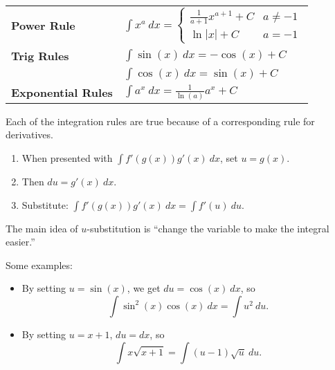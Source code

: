 \begin{center}
\def\arraystretch{1.5}
\begin{tabular}{@{}ll@{}}
\toprule[0.4mm]
\textbf{Power Rule}
 & $\int x^a \ dx = \begin{cases}
\frac{1}{a+1}x^{a+1} + C & a \neq -1\\
\ln|x| + C & a = -1
\end{cases}$ \\
\textbf{Trig Rules}  & $\int \sin(x)\ dx = -\cos(x)+C$\\
                     & $\int \cos(x)\ dx = \sin(x)+C$ \\
\textbf{Exponential Rules} & $\int a^x\ dx = \frac{1}{\ln(a)}a^x+C$ \\
\bottomrule[0.4mm]
\end{tabular}
\end{center}

Each of the integration rules are true because of a corresponding rule for derivatives. 


\begin{strat}[$u$-substitution]
    \begin{enumerate}[leftmargin=1em]
        \item When presented with $\int f'(g(x))g'(x)\ dx$, set $u=g(x)$.
        \item Then $du=g'(x)\ dx$.
        \item Substitute: $\int f'(g(x))g'(x)\ dx = \int f'(u)\ du$.
    \end{enumerate}
\end{strat}

The main idea of $u$-substitution is ``change the variable to make the integral easier.''


Some examples:
\begin{itemize}
    \item By setting $u=\sin(x)$, we get $du=\cos(x)\ dx$, so
    $$\int \sin^2(x)\cos(x)\ dx= \int u^2\ du.$$
    \item By setting $u=x+1$, $du=dx$, so
    $$\int x\sqrt{x+1}=\int(u-1)\sqrt{u}\ du.$$
\end{itemize}


